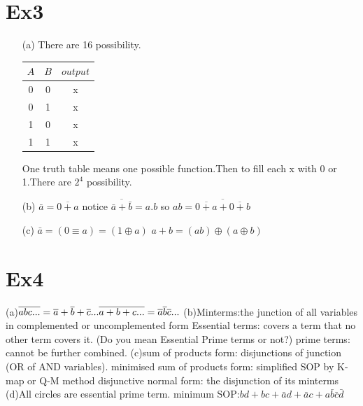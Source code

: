 \documentclass[10pt,twoside,a4paper]{article}
\begin{document}
\section{Ex3}
\begin{enumerate}
\item[(a)] 
There are 16 possibility.\newline
\begin{tabular}{ccc}
$A$ & $B$ & $output$\\
\hline
0   & 0   & x\\
0   & 1   & x\\
1   & 0   & x\\
1   & 1   & x\\
\end{tabular}\newline
One truth table means one possible function.Then to fill each x with 
0 or 1.\newline There are $2^4$ possibility.
\item[(b)]
$\bar{a}=\overline{0+a}$\newline
notice $\overline{\bar{a}+\bar{b}}=a.b$\newline
so $ab=\overline{\overline{0+a}+\overline{0+b}} $
\item[(c)]
$\bar{a}=(0\equiv a)=(1\oplus a)$\newline
$a+b=(ab)\oplus (a\oplus b)$

\end{enumerate}

\section{Ex4}

(a)$\overline{abc...}=\overline{a}+\overline{b}+\overline{c}...\\
\overline{a+b+c...}=\overline{a}\overline{b}\overline{c}...
$\newline
(b)Minterms:the junction of all variables in complemented or uncomplemented form\newline
   Essential terms: covers a term that no other term covers it. (Do you mean Essential Prime terms or not?)\newline
   prime terms: cannot be further combined.\newline
(c)sum of products form: disjunctions of junction (OR of AND variables).\newline
   minimised sum of products form: simplified SOP by K-map or  Q-M method\newline
   disjunctive normal form: the disjunction of its minterms\newline
(d)All circles are essential prime term.\newline
   minimum SOP:$bd+bc+\bar{a}d+\bar{a}c+a\bar{b}\bar{c}\bar{d}$\newline
   
\end{document}
